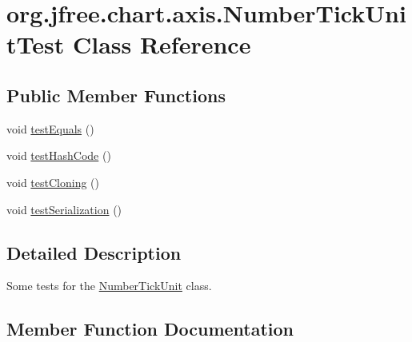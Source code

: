 \hypertarget{classorg_1_1jfree_1_1chart_1_1axis_1_1_number_tick_unit_test}{}\section{org.\+jfree.\+chart.\+axis.\+Number\+Tick\+Unit\+Test Class Reference}
\label{classorg_1_1jfree_1_1chart_1_1axis_1_1_number_tick_unit_test}
\subsection*{Public Member Functions}
\begin{DoxyCompactItemize}
\item 
void \mbox{\hyperlink{classorg_1_1jfree_1_1chart_1_1axis_1_1_number_tick_unit_test_adfc6fbf1a5b691f4435149d5e7d250ed}{test\+Equals}} ()
\item 
void \mbox{\hyperlink{classorg_1_1jfree_1_1chart_1_1axis_1_1_number_tick_unit_test_a218d544e3cff9dd5d33f132d4fcf2279}{test\+Hash\+Code}} ()
\item 
void \mbox{\hyperlink{classorg_1_1jfree_1_1chart_1_1axis_1_1_number_tick_unit_test_a2e3b39022844115f2a7e52533cf7d731}{test\+Cloning}} ()
\item 
void \mbox{\hyperlink{classorg_1_1jfree_1_1chart_1_1axis_1_1_number_tick_unit_test_a3891f5b3736e71921091df9d62c6a283}{test\+Serialization}} ()
\end{DoxyCompactItemize}


\subsection{Detailed Description}
Some tests for the \mbox{\hyperlink{classorg_1_1jfree_1_1chart_1_1axis_1_1_number_tick_unit}{Number\+Tick\+Unit}} class. 

\subsection{Member Function Documentation}
\mbox{\label{classorg_1_1jfree_1_1chart_1_1axis_1_1_number_tick_unit_test_a2e3b39022844115f2a7e52533cf7d731}} 

